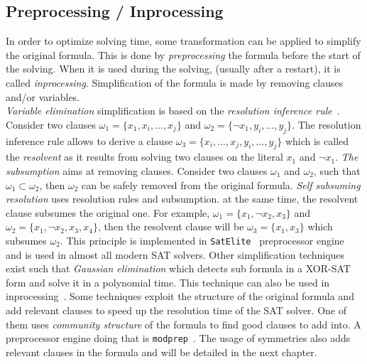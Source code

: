 \subsection{Preprocessing / Inprocessing}
In order to optimize solving time, some transformation can be applied to simplify the original formula.
This is done by \emph{preprocessing} the formula before the start of the solving.
When it is used during the solving, (usually after a restart), it is called \emph{inprocessing}.
Simplification of the formula is made by removing clauses and/or variables.\\
\emph{Variable elimination} simplification is based on the \emph{resolution inference rule}~\cite{robinson1965machine}.
Consider two clauses $\omega_1 = \{x_1, x_i, ..., x_j \}$ and $\omega_2 = \{\neg x_1, y_i, ..., y_j\}$.
The resolution inference rule allows to derive a clause $\omega_3 = \{x_i, ..., x_j, y_i, ..., y_j\}$ which is called
the \emph{resolvent} as it results from solving two clauses on the literal $x_1$ and $\neg x_1$.
\emph{The subsumption} aims at removing  clauses. Consider two clauses $\omega_1$ and $\omega_2$, such that
$\omega_1 \subset  \omega_2$, then $\omega_2$ can be safely removed from the original formula.
\emph{Self subsuming resolution} uses resolution rules and subsumption. at the same time,
the resolvent clause subsumes the original one. For example, $\omega_1 = \{x_1, \neg x_2, x_3\}$ and $\omega_2 = \{x_1, \neg x_2, x_3, x_4\}$,
 then the resolvent clause will be $\omega_3 = \{x_1, x_3\}$ which subsumes $\omega_2$. This principle
is implemented in \texttt{SatElite}~\cite{een2005effective} preprocessor engine and is used in almost all modern SAT solvers.
Other simplification techniques exist such that \emph{Gaussian elimination} which detects sub formula in a XOR-SAT
form and solve it in a polynomial time. This technique can also be used in inprocessing~\cite{soos2010enhanced}. 
Some techniques exploit the structure of the original formula and add relevant clauses to speed up the resolution
time of the SAT solver. One of them uses \textit{community structure} of the formula to find good clauses to add into.
A preprocessor engine doing that is  \texttt{modprep}~\cite{ansotegui2015using}.
The usage of symmetries also adds relevant clauses in the formula and will be detailed in the next chapter.

